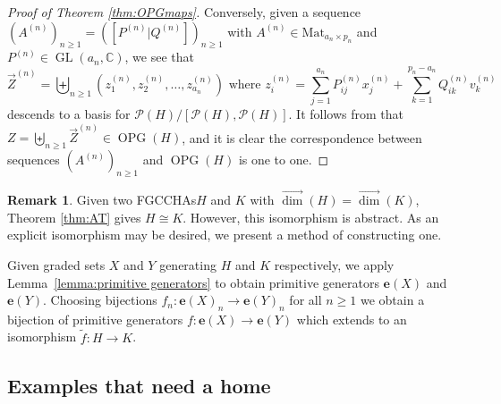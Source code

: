 \documentclass[11pt]{amsart}
\theoremstyle{definition}
\newtheorem{remark}[theorem]{Remark}
\numberwithin{equation}{section}
\def\CC{{\mathbb C}}
\DeclareMathOperator{\GL}{GL}
\newcommand{\FGCCHAs}{\textsf{FGCCHA}s\xspace}
\newcommand{\vecdim}{\overrightarrow{\dim}}
\newcommand{\OPG}{\operatorname{OPG}}
\begin{document}
\begin{proof}[Proof of Theorem \ref{thm:OPGmaps}]
    Conversely, given a sequence $\left(A^{(n)}\right)_{n \geq 1} = \left([P^{(n)}|Q^{(n)}]\right)_{n \geq 1}$ with $A^{(n)} \in \textrm{Mat}_{a_n \times p_n}$ and $P^{(n)} \in \GL(a_n,\CC)$, we see that
    \[
    \vec{Z}^{(n)} = \biguplus_{n\geq 1} \left(z_1^{(n)},z_2^{(n)},\ldots,z_{a_n}^{(n)}\right) \text{ where } z_i^{(n)} = \sum_{j = 1}^{a_n}P_{ij}^{(n)}x_{j}^{(n)} + \sum_{k = 1}^{p_n - a_n}Q_{ik}^{(n)}v_k^{(n)}
    \]
    descends to a basis for $\mathcal{P}(H)/[\mathcal{P}(H),\mathcal{P}(H)]$.
    It follows from \cite[Corollary 2.6]{F23}
     that $Z = \biguplus_{n \geq 1} \vec{Z}^{(n)} \in \OPG(H)$,
     and it is clear the correspondence between sequences
     $\left(A^{(n)}\right)_{n \geq 1}$ and $\OPG(H)$ is one to one.
\end{proof}


\begin{remark}
    Given two \FGCCHAs $H$ and $K$ with $\vecdim(H) = \vecdim(K)$, Theorem \ref{thm:AT} gives $H \cong K$. However, this isomorphism is abstract. As an explicit isomorphism may be desired, we present a method of constructing one. 
    
    Given graded sets $X$ and $Y$ generating $H$ and $K$ respectively, we apply Lemma~\ref{lemma:primitive generators} to obtain primitive generators $\mathbf{e}(X)$ and $\mathbf{e}(Y)$. Choosing bijections $f_n:\mathbf{e}(X)_n \to \mathbf{e}(Y)_n$ for all $n \geq 1$ we obtain a bijection of primitive generators $f:\mathbf{e}(X) \to \mathbf{e}(Y)$ which extends to an isomorphism $\tilde{f}:H \to K$.
\end{remark}

\subsection{Examples that need a home}
\end{document}
